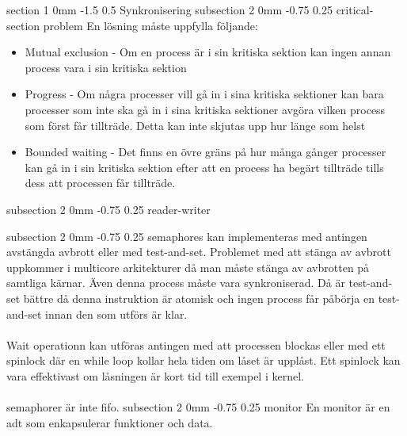 \documentclass[a4paper,11pt]{article}
\makeatletter
\renewcommand{\section}{\@startsection
   {section}%
   {1}%
   {0mm}%
   {-1.5\baselineskip}%
   {0.5\baselineskip}%
   {\sffamily\bfseries\upshape\normalsize}}%
\renewcommand{\subsection}{\@startsection
   {subsection}%
   {2}%
   {0mm}%
   {-0.75\baselineskip}%
   {0.25\baselineskip}%
   {\rmfamily\normalfont\slshape\normalsize}}%
\makeatother
\begin{document}
\section{Synkronisering}
\subsection{critical-section problem}
En lösning måste uppfylla följande:
\begin{itemize}
\item Mutual exclusion - Om en process är i sin kritiska sektion kan ingen annan process vara i sin kritiska sektion
\item Progress - Om några processer vill gå in i sina kritiska sektioner kan bara processer som inte ska gå in i sina kritiska sektioner avgöra vilken process som först får tillträde. Detta kan inte skjutas upp hur länge som helst
\item Bounded waiting - Det finns en övre gräns på hur många gånger processer kan gå in i sin kritiska sektion efter att en process ha begärt tillträde tills dess att processen får tillträde.
\end{itemize}
\subsection{reader-writer}

\subsection{semaphores}
kan implementeras med antingen avstängda avbrott eller med test-and-set. Problemet med att stänga av avbrott uppkommer i multicore arkitekturer då man måste stänga av avbrotten på samtliga kärnar. Även denna process måste vara synkroniserad. Då är test-and-set bättre då denna instruktion är atomisk och ingen process får påbörja en test-and-set innan den som utförs är klar. \\ \\
Wait operationn kan utföras antingen med att processen blockas eller med ett spinlock där en while loop kollar hela tiden om låset är upplåst. Ett spinlock kan vara effektivast om låsningen är kort tid till exempel i kernel. \\ \\
semaphorer är inte fifo.
\subsection{monitor}
En monitor är en adt som enkapsulerar funktioner och data. 
\end{document}
